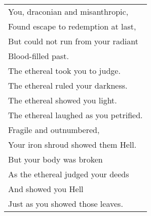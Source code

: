 \documentclass{article}
\begin{document}
\begin{center}
\begin{tabular}{l}
You, draconian and misanthropic, \\
Found escape to redemption at last, \\
But could not run from your radiant \\
Blood-filled past. \\
The ethereal took you to judge. \\
The ethereal ruled your darkness. \\
The ethereal showed you light. \\
The ethereal laughed as you petrified. \\
Fragile and outnumbered, \\
Your iron shroud showed them Hell. \\
But your body was broken \\
As the ethereal judged your deeds \\
And showed you Hell \\
Just as you showed those leaves.\\
\end{tabular}
\end{center}

\newpage
\end{document}
